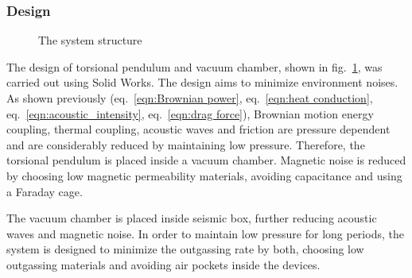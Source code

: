 \documentclass[\main/master.tex]{subfiles}
\begin{document}
\subsubsection{Design}
\begin{figure}[htbp]
	\centering
	\caption[Total chamber]{The system structure}
	\label{fig:Total chamber}
\end{figure}
\FloatBarrier
\par\noindent
The design of torsional pendulum and vacuum chamber, shown in fig.~\ref{fig:Total chamber}, was carried out using Solid Works. The design aims to minimize environment noises. 
As shown previously (eq.~\ref{eqn:Brownian power}, eq.~\ref{eqn:heat conduction}, eq.~\ref{eqn:acoustic_intensity}, eq.~\ref{eqn:drag force}), Brownian motion energy coupling, thermal coupling, acoustic waves and friction are pressure dependent and are considerably reduced by maintaining low pressure. Therefore, the torsional pendulum is placed inside a vacuum chamber. Magnetic noise is reduced by choosing low magnetic permeability materials, avoiding capacitance and using a Faraday cage. 
\par\noindent
The vacuum chamber is placed inside seismic box, further reducing acoustic waves and magnetic noise. In order to maintain low pressure for long periods, the system is designed to minimize the outgassing rate by both, choosing low outgassing materials and avoiding air pockets inside the devices. 
\end{document}
